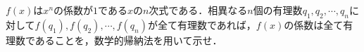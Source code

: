 \documentclass[../../main.tex]{subfiles}
\begin{document}
$f(x)$は$x^n$の係数が$1$である$x$の$n$次式である．相異なる$n$個の有理数$q_1,q_2,\cdots ,q_n$に対して$f(q_1),f(q_2),\cdots,f(q_n)$が全て有理数であれば，$f(x)$の係数は全て有理数であることを，数学的帰納法を用いて示せ．
\end{document}
